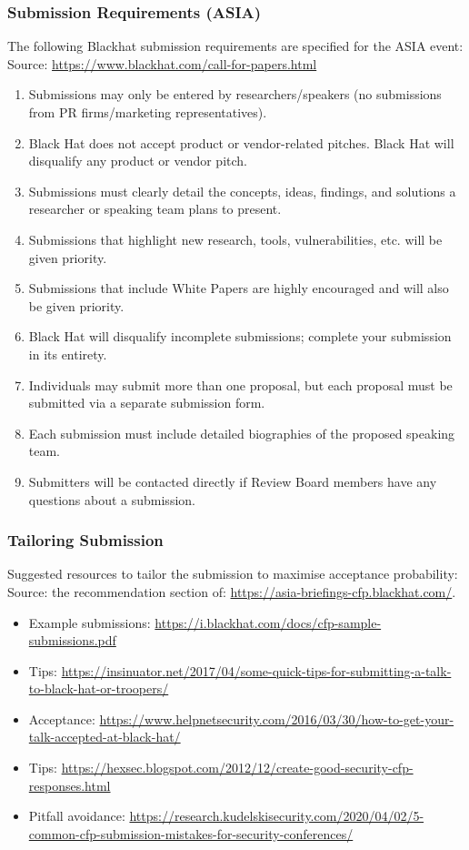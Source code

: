 \subsubsection{Submission Requirements (ASIA)}
The following Blackhat submission requirements are specified for the ASIA event:\\
Source: \url{https://www.blackhat.com/call-for-papers.html}
\begin{enumerate}
	\item Submissions may only be entered by researchers/speakers (no submissions from PR firms/marketing representatives).
	\item Black Hat does not accept product or vendor-related pitches. Black Hat will disqualify any product or vendor pitch.
	\item Submissions must clearly detail the concepts, ideas, findings, and solutions a researcher or speaking team plans to present.
	\item Submissions that highlight new research, tools, vulnerabilities, etc. will be given priority.
	\item Submissions that include White Papers are highly encouraged and will also be given priority.
	\item Black Hat will disqualify incomplete submissions; complete your submission in its entirety.
	\item Individuals may submit more than one proposal, but each proposal must be submitted via a separate submission form.
	\item Each submission must include detailed biographies of the proposed speaking team.
	\item Submitters will be contacted directly if Review Board members have any questions about a submission.
\end{enumerate}

\subsubsection{Tailoring Submission}
Suggested resources to tailor the submission to maximise acceptance probability:\\
Source: the recommendation section of: \url{https://asia-briefings-cfp.blackhat.com/}.
\begin{itemize}
	\item Example submissions: \url{https://i.blackhat.com/docs/cfp-sample-submissions.pdf}
	\item Tips: \url{https://insinuator.net/2017/04/some-quick-tips-for-submitting-a-talk-to-black-hat-or-troopers/}
	\item Acceptance: \url{https://www.helpnetsecurity.com/2016/03/30/how-to-get-your-talk-accepted-at-black-hat/}
	\item Tips: \url{https://hexsec.blogspot.com/2012/12/create-good-security-cfp-responses.html}
	\item Pitfall avoidance: \url{https://research.kudelskisecurity.com/2020/04/02/5-common-cfp-submission-mistakes-for-security-conferences/}
\end{itemize}